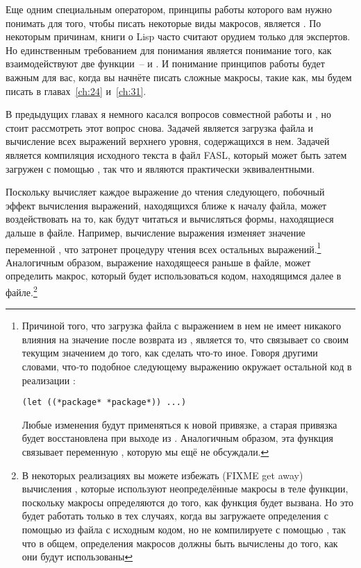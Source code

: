 Еще одним специальным оператором, принципы работы которого вам нужно понимать для того,
чтобы писать некоторые виды макросов, является .  По некоторым причинам,
книги о Lisp часто считают  орудием только для экспертов.  Но единственным
требованием для понимания  является понимание того, как взаимодействуют
две функции~--  и .  И понимание принципов работы
 будет важным для вас, когда вы начнёте писать сложные макросы, такие как,
мы будем писать в главах~\ref{ch:24} и~\ref{ch:31}.

В предыдущих главах я немного касался вопросов совместной работы  и
, но стоит рассмотреть этот вопрос снова.  Задачей  является
загрузка файла и вычисление всех выражений верхнего уровня, содержащихся в нем.  Задачей
 является компиляция исходного текста в файл FASL, который может быть
затем загружен с помощью , так что  и  являются практически эквивалентными.

Поскольку  вычисляет каждое выражение до чтения следующего, побочный эффект
вычисления выражений, находящихся ближе к началу файла, может воздействовать на то, как
будут читаться и вычисляться формы, находящиеся дальше в файле.  Например, вычисление
выражения  изменяет значение переменной , что затронет
процедуру чтения всех остальных выражений.\footnote{Причиной того, что загрузка файла с
  выражением  в нем не имеет никакого влияния на значение
   после возврата из , является то, что  связывает
   со своим текущим значением до того, как сделать что-то иное.  Говоря
  другими словами, что-то подобное следующему выражению  окружает остальной код
  в реализации :

\begin{lstlisting}
(let ((*package* *package*)) ...)
\end{lstlisting}

Любые изменения  будут применяться к новой привязке, а старая привязка
будет восстановлена при выходе из .  Аналогичным образом, эта функция связывает
переменную , которую мы ещё не обсуждали.}  Аналогичным образом,
выражение  находящееся раньше в файле, может определить макрос, который
будет использоваться кодом, находящимся далее в файле.\footnote{В некоторых реализациях вы
  можете избежать (FIXME get away) вычисления , которые используют
  неопределённые макросы в теле функции, поскольку макросы определяются до того, как
  функция будет вызвана.  Но это будет работать только в тех случаях, когда вы загружаете
  определения с помощью  из файла с исходным кодом, но не компилируете с
  помощью , так что в общем, определения макросов должны быть вычислены
  до того, как они будут использованы}

